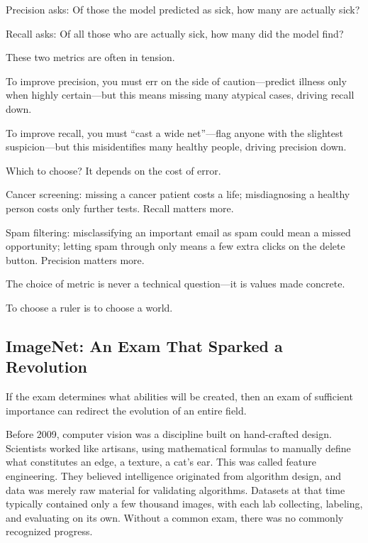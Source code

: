 Precision asks: Of those the model predicted as sick, how many are actually sick?

Recall asks: Of all those who are actually sick, how many did the model find?

These two metrics are often in tension.

To improve precision, you must err on the side of caution---predict illness only when highly certain---but this means missing many atypical cases, driving recall down.

To improve recall, you must ``cast a wide net''---flag anyone with the slightest suspicion---but this misidentifies many healthy people, driving precision down.

\vspace{1em}

Which to choose? It depends on the cost of error.

Cancer screening: missing a cancer patient costs a life; misdiagnosing a healthy person costs only further tests. Recall matters more.

Spam filtering: misclassifying an important email as spam could mean a missed opportunity; letting spam through only means a few extra clicks on the delete button. Precision matters more.

\begin{importantbox}
    The choice of metric is never a technical question---it is values made concrete.

    To choose a ruler is to choose a world.

\end{importantbox}

\subsection{ImageNet: An Exam That Sparked a Revolution}
If the exam determines what abilities will be created, then an exam of sufficient importance can redirect the evolution of an entire field.

Before 2009, computer vision was a discipline built on hand-crafted design. Scientists worked like artisans, using mathematical formulas to manually define what constitutes an edge, a texture, a cat's ear. This was called feature engineering. They believed intelligence originated from algorithm design, and data was merely raw material for validating algorithms.
Datasets at that time typically contained only a few thousand images, with each lab collecting, labeling, and evaluating on its own. Without a common exam, there was no commonly recognized progress.

